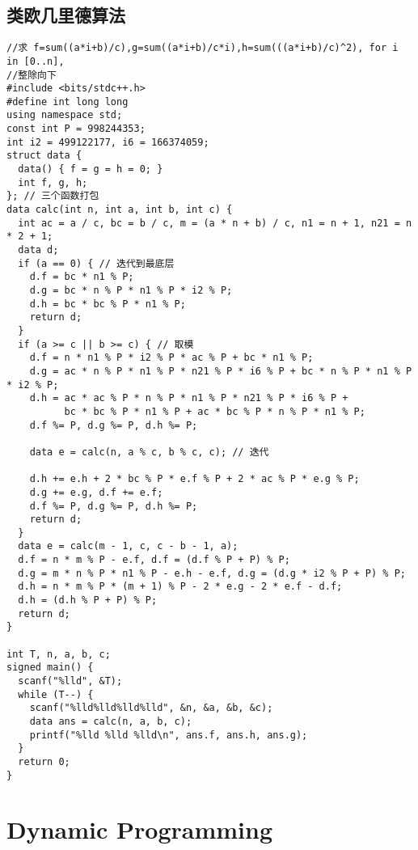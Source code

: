 \documentclass[twoside]{article}
\begin{document}
\subsection{类欧几里德算法}
\begin{lstlisting}
//求 f=sum((a*i+b)/c),g=sum((a*i+b)/c*i),h=sum(((a*i+b)/c)^2), for i in [0..n],
//整除向下
#include <bits/stdc++.h>
#define int long long
using namespace std;
const int P = 998244353;
int i2 = 499122177, i6 = 166374059;
struct data {
  data() { f = g = h = 0; }
  int f, g, h;
}; // 三个函数打包
data calc(int n, int a, int b, int c) {
  int ac = a / c, bc = b / c, m = (a * n + b) / c, n1 = n + 1, n21 = n * 2 + 1;
  data d;
  if (a == 0) { // 迭代到最底层
    d.f = bc * n1 % P;
    d.g = bc * n % P * n1 % P * i2 % P;
    d.h = bc * bc % P * n1 % P;
    return d;
  }
  if (a >= c || b >= c) { // 取模
    d.f = n * n1 % P * i2 % P * ac % P + bc * n1 % P;
    d.g = ac * n % P * n1 % P * n21 % P * i6 % P + bc * n % P * n1 % P * i2 % P;
    d.h = ac * ac % P * n % P * n1 % P * n21 % P * i6 % P +
          bc * bc % P * n1 % P + ac * bc % P * n % P * n1 % P;
    d.f %= P, d.g %= P, d.h %= P;

    data e = calc(n, a % c, b % c, c); // 迭代

    d.h += e.h + 2 * bc % P * e.f % P + 2 * ac % P * e.g % P;
    d.g += e.g, d.f += e.f;
    d.f %= P, d.g %= P, d.h %= P;
    return d;
  }
  data e = calc(m - 1, c, c - b - 1, a);
  d.f = n * m % P - e.f, d.f = (d.f % P + P) % P;
  d.g = m * n % P * n1 % P - e.h - e.f, d.g = (d.g * i2 % P + P) % P;
  d.h = n * m % P * (m + 1) % P - 2 * e.g - 2 * e.f - d.f;
  d.h = (d.h % P + P) % P;
  return d;
}

int T, n, a, b, c;
signed main() {
  scanf("%lld", &T);
  while (T--) {
    scanf("%lld%lld%lld%lld", &n, &a, &b, &c);
    data ans = calc(n, a, b, c);
    printf("%lld %lld %lld\n", ans.f, ans.h, ans.g);
  }
  return 0;
}

\end{lstlisting}

\section{Dynamic Programming}
\end{document}
